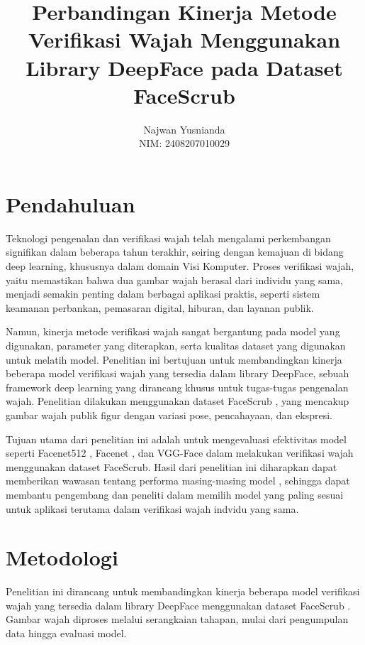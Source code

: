 \documentclass[a4paper, 11pt]{article}
\title{Perbandingan Kinerja Metode Verifikasi Wajah Menggunakan Library DeepFace pada Dataset FaceScrub}
\author{Najwan Yusnianda\\NIM: 2408207010029}
\date{}
\begin{document}
\maketitle



\section{Pendahuluan}

Teknologi pengenalan dan verifikasi wajah telah mengalami perkembangan signifikan dalam beberapa tahun terakhir, seiring dengan kemajuan di bidang deep learning, khususnya dalam domain Visi Komputer. Proses verifikasi wajah, yaitu memastikan bahwa dua gambar wajah berasal dari individu yang sama, menjadi semakin penting dalam berbagai aplikasi praktis, seperti sistem keamanan perbankan, pemasaran digital, hiburan, dan layanan publik.

Namun, kinerja metode verifikasi wajah sangat bergantung pada model yang digunakan, parameter yang diterapkan, serta kualitas dataset yang digunakan untuk melatih model. Penelitian ini bertujuan untuk membandingkan kinerja beberapa model verifikasi wajah yang tersedia dalam library DeepFace, sebuah framework deep learning yang dirancang khusus untuk tugas-tugas pengenalan wajah. Penelitian dilakukan menggunakan dataset FaceScrub , yang mencakup gambar wajah publik figur dengan variasi pose, pencahayaan, dan ekspresi.

Tujuan utama dari penelitian ini adalah untuk mengevaluasi efektivitas model seperti Facenet512 , Facenet , dan VGG-Face dalam melakukan verifikasi wajah menggunakan dataset FaceScrub. Hasil dari penelitian ini diharapkan dapat memberikan wawasan tentang performa masing-masing model , sehingga dapat membantu pengembang dan peneliti dalam memilih model yang paling sesuai untuk aplikasi terutama dalam verifikasi wajah indvidu yang sama.


\section{Metodologi}
Penelitian ini dirancang untuk membandingkan kinerja beberapa model verifikasi wajah yang tersedia dalam library DeepFace menggunakan dataset FaceScrub . Gambar wajah diproses melalui serangkaian tahapan, mulai dari pengumpulan data hingga evaluasi model.
\end{document}
